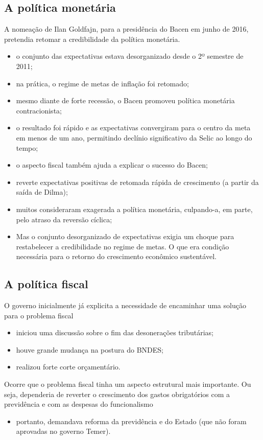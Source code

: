 \documentclass[a4paper,12pt]{article}[abntex2]
\begin{document}
\subsection{\textbf{A política monetária}}
A nomeação de Ilan Goldfajn, para a presidência do Bacen em junho de 2016, pretendia retomar a credibilidade da política monetária.
\begin{itemize}
    \item o conjunto das expectativas estava desorganizado desde o 2º semestre de 2011;
    \item na prática, o regime de metas de inflação foi retomado;
    \item mesmo diante de forte recessão, o Bacen promoveu política monetária contracionista;
    \item o resultado foi rápido e as expectativas convergiram para o centro da meta em menos de um ano, permitindo declínio significativo da Selic ao longo do tempo;
    \item o aspecto fiscal também ajuda a explicar o sucesso do Bacen;
    \item reverte expectativas positivas de retomada rápida de crescimento (a partir da saída de Dilma);
    \item muitos consideraram exagerada a política monetária, culpando-a, em parte, pelo atraso da reversão cíclica;
    \item Mas o conjunto desorganizado de expectativas exigia um choque para restabelecer a credibilidade no regime de metas. O que era condição necessária para o retorno do crescimento econômico sustentável.
\end{itemize}

\subsection{\textbf{A política fiscal}}
O governo inicialmente já explicita a necessidade de encaminhar uma solução para o problema fiscal
\begin{itemize}
    \item iniciou uma discussão sobre o fim das desonerações tributárias;
    \item houve grande mudança na postura do BNDES;
    \item realizou forte corte orçamentário.
\end{itemize}

Ocorre que o problema fiscal tinha um aspecto estrutural mais importante. Ou seja, dependeria de reverter o crescimento dos gastos obrigatórios com a previdência e com as despesas do funcionalismo
\begin{itemize}
    \item portanto, demandava reforma da previdência e do Estado (que não foram aprovadas no governo Temer).
\end{itemize}
\end{document}

